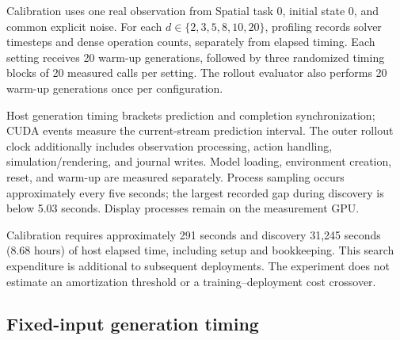 \documentclass{article}
\begin{document}
\begin{table}[htbp]
\centering\small
\caption{Discovery successes on Spatial tasks 5--8. Each task contributes five
states and two seeds per configuration. Rate/native is
$F_{\mathrm{gen}}(d)/(hF_{\mathrm{gen}}(10))$, not realized episode cost.
The best observed count is 28/40 at $(1,5)$; no monotonic denoising trend is
assumed.}
\label{tab:discovery-grid}

\end{table}

Calibration uses one real observation from Spatial task 0, initial state 0,
and common explicit noise. For each $d\in\{2,3,5,8,10,20\}$, profiling records
solver timesteps and dense operation counts, separately from elapsed timing.
Each setting receives 20 warm-up generations, followed by three randomized
timing blocks of 20 measured calls per setting. The rollout evaluator also
performs 20 warm-up generations once per configuration.

Host generation timing brackets prediction and completion synchronization;
CUDA events measure the current-stream prediction interval. The outer rollout
clock additionally includes observation processing, action handling,
simulation/rendering, and journal writes. Model loading, environment creation,
reset, and warm-up are measured separately. Process sampling occurs approximately
every five seconds; the largest recorded gap during discovery is below
5.03 seconds. Display processes remain on the measurement GPU.

\begin{table}[htbp]
\centering\small
\caption{Discovery resource measurements. Generated-chunk totals use the declared
dense-arithmetic boundary and charge partially executed final prefixes.
Episode means include unsuccessful attempts. $(2,2)$ has 26/40 observed
successes at 42.9\% of native arithmetic rate.}
\label{tab:resources}

\end{table}

Calibration requires approximately 291 seconds and discovery 31,245 seconds
(8.68 hours) of host elapsed time, including setup and bookkeeping. This search
expenditure is additional to subsequent deployments. The experiment does not
estimate an amortization threshold or a training--deployment cost crossover.

\subsection{Fixed-input generation timing}
\label{app:fixed-timing}
\end{document}

